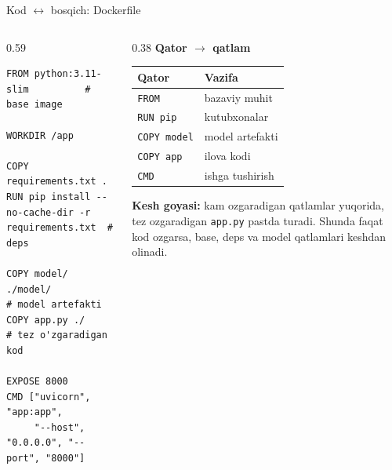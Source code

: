 \documentclass[aspectratio=169,11pt]{beamer}
\newcommand{\uzq}{\textquotesingle{}}   %
\begin{document}
\begin{frame}[fragile]{Kod $\leftrightarrow$ bosqich: Dockerfile}
  \small

  \begin{columns}[T,totalwidth=\textwidth]
    \begin{column}{0.59\textwidth}
\begin{lstlisting}[basicstyle=\ttfamily\scriptsize]
FROM python:3.11-slim          # base image

WORKDIR /app

COPY requirements.txt .
RUN pip install --no-cache-dir -r requirements.txt  # deps

COPY model/ ./model/           # model artefakti
COPY app.py ./                 # tez o'zgaradigan kod

EXPOSE 8000
CMD ["uvicorn", "app:app",
     "--host", "0.0.0.0", "--port", "8000"]
\end{lstlisting}
    \end{column}

    \begin{column}{0.38\textwidth}
      \textbf{Qator $\to$ qatlam}\\[3pt]

      \footnotesize
      \renewcommand{\arraystretch}{1.12}
      \begin{tabular}{p{1.75cm}p{2.05cm}}
        \toprule
        \textbf{Qator} & \textbf{Vazifa} \\
        \midrule
        \texttt{FROM} & bazaviy muhit \\
        \texttt{RUN pip} & kutubxonalar \\
        \texttt{COPY model} & model artefakti \\
        \texttt{COPY app} & ilova kodi \\
        \texttt{CMD} & ishga tushirish \\
        \bottomrule
      \end{tabular}

      \vspace{5pt}

      \begin{tcolorbox}[okbox,top=2pt,bottom=2pt,left=3pt,right=3pt]
        \footnotesize
        \textbf{Kesh g\uzq{}oyasi:}
        kam o\uzq{}zgaradigan qatlamlar yuqorida, tez o\uzq{}zgaradigan
        \texttt{app.py} pastda turadi. Shunda faqat kod o\uzq{}zgarsa,
        base, deps va model qatlamlari keshdan olinadi.
      \end{tcolorbox}
    \end{column}
  \end{columns}
\end{frame}
\end{document}
